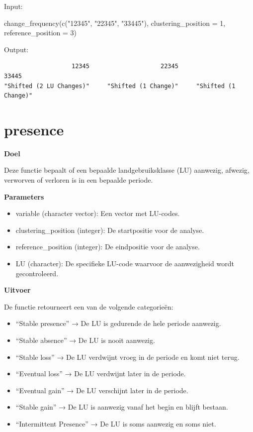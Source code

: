 \documentclass[twoside]{extreport}
\newenvironment{Shaded}{\begin{snugshade}}{\end{snugshade}}
\newcommand{\AttributeTok}[1]{\textcolor[rgb]{0.40,0.45,0.13}{#1}}
\newcommand{\DecValTok}[1]{\textcolor[rgb]{0.68,0.00,0.00}{#1}}
\newcommand{\FunctionTok}[1]{\textcolor[rgb]{0.28,0.35,0.67}{#1}}
\newcommand{\NormalTok}[1]{\textcolor[rgb]{0.00,0.23,0.31}{#1}}
\newcommand{\StringTok}[1]{\textcolor[rgb]{0.13,0.47,0.30}{#1}}
\providecommand{\tightlist}{%
  \setlength{\itemsep}{0pt}\setlength{\parskip}{0pt}}\usepackage{longtable,booktabs,array}
\begin{document}
Input:

\begin{Shaded}
\begin{Highlighting}[]
\FunctionTok{change\_frequency}\NormalTok{(}\FunctionTok{c}\NormalTok{(}\StringTok{"12345"}\NormalTok{, }\StringTok{"22345"}\NormalTok{, }\StringTok{"33445"}\NormalTok{), }\AttributeTok{clustering\_position =} \DecValTok{1}\NormalTok{,}
         \AttributeTok{reference\_position =} \DecValTok{3}\NormalTok{)}
\end{Highlighting}
\end{Shaded}

Output:

\begin{verbatim}
                   12345                    22345                    33445 
"Shifted (2 LU Changes)"     "Shifted (1 Change)"     "Shifted (1 Change)" 
\end{verbatim}

\section{presence}\label{presence}

\textbf{Doel}

Deze functie bepaalt of een bepaalde landgebruiksklasse (LU) aanwezig,
afwezig, verworven of verloren is in een bepaalde periode.

\textbf{Parameters}

\begin{itemize}
\tightlist
\item
  variable (character vector): Een vector met LU-codes.
\item
  clustering\_position (integer): De startpositie voor de analyse.
\item
  reference\_position (integer): De eindpositie voor de analyse.
\item
  LU (character): De specifieke LU-code waarvoor de aanwezigheid wordt
  gecontroleerd.
\end{itemize}

\textbf{Uitvoer}

De functie retourneert een van de volgende categorieën:

\begin{itemize}
\tightlist
\item
  ``Stable presence'' → De LU is gedurende de hele periode aanwezig.
\item
  ``Stable absence'' → De LU is nooit aanwezig.
\item
  ``Stable loss'' → De LU verdwijnt vroeg in de periode en komt niet
  terug.
\item
  ``Eventual loss'' → De LU verdwijnt later in de periode.
\item
  ``Eventual gain'' → De LU verschijnt later in de periode.
\item
  ``Stable gain'' → De LU is aanwezig vanaf het begin en blijft bestaan.
\item
  ``Intermittent Presence'' → De LU is soms aanwezig en soms niet.
\end{itemize}
\end{document}
